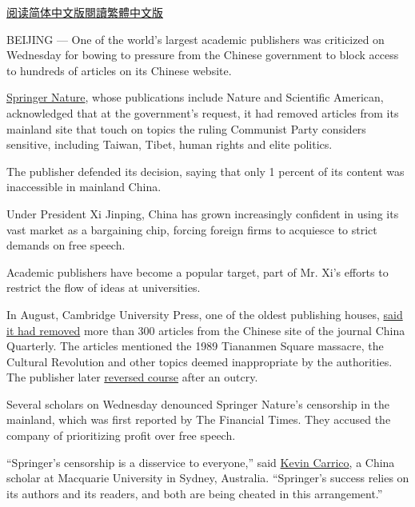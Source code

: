 \href{https://cn.nytimes3xbfgragh.onion/china/20171102/china-springer-nature-censorship/}{阅读简体中文版}\href{https://cn.nytimes3xbfgragh.onion/china/20171102/china-springer-nature-censorship/zh-hant/}{閱讀繁體中文版}

BEIJING --- One of the world's largest academic publishers was
criticized on Wednesday for bowing to pressure from the Chinese
government to block access to hundreds of articles on its Chinese
website.

\href{http://www.springernature.com/us/}{Springer Nature}, whose
publications include Nature and Scientific American, acknowledged that
at the government's request, it had removed articles from its mainland
site that touch on topics the ruling Communist Party considers
sensitive, including Taiwan, Tibet, human rights and elite politics.

The publisher defended its decision, saying that only 1 percent of its
content was inaccessible in mainland China.

Under President Xi Jinping, China has grown increasingly confident in
using its vast market as a bargaining chip, forcing foreign firms to
acquiesce to strict demands on free speech.

Academic publishers have become a popular target, part of Mr. Xi's
efforts to restrict the flow of ideas at universities.

In August, Cambridge University Press, one of the oldest publishing
houses,
\href{https://www.nytimes3xbfgragh.onion/2017/08/18/world/asia/cambridge-university-press-academic-freedom.html}{said
it had removed} more than 300 articles from the Chinese site of the
journal China Quarterly. The articles mentioned the 1989 Tiananmen
Square massacre, the Cultural Revolution and other topics deemed
inappropriate by the authorities. The publisher later
\href{https://www.nytimes3xbfgragh.onion/2017/08/21/world/asia/china-quarterly-cambridge-university-press-censorship-publisher-reverses-decision-to-bow-to-chinas-censors.html?_r=0}{reversed
course} after an outcry.

Several scholars on Wednesday denounced Springer Nature's censorship in
the mainland, which was first reported by The Financial Times. They
accused the company of prioritizing profit over free speech.

``Springer's censorship is a disservice to everyone,'' said
\href{https://www.mq.edu.au/about_us/faculties_and_departments/faculty_of_arts/department_of_international_studies/staff/staff_chinese_studies/dr_kevin_carrico}{Kevin
Carrico}, a China scholar at Macquarie University in Sydney, Australia.
``Springer's success relies on its authors and its readers, and both are
being cheated in this arrangement.''

